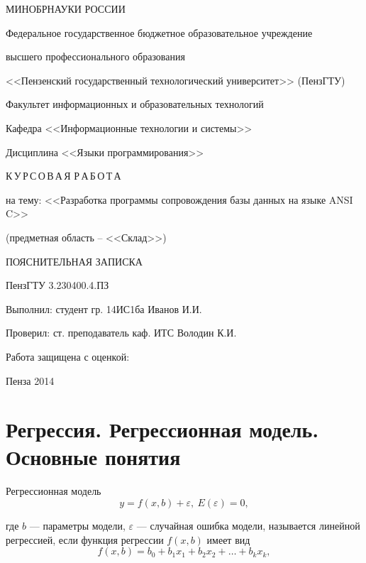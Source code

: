 \documentclass[oneside,a4paper,final,14pt]{article}
\begin{document}
	
\thispagestyle{empty}
\begin{center}
МИНОБРНАУКИ РОССИИ

Федеральное государственное бюджетное образовательное учреждение 

высшего профессионального образования

<<Пензенский государственный технологический университет>>
(ПензГТУ)

\vspace{36pt}

Факультет информационных и образовательных технологий

Кафедра <<Информационные технологии и системы>>

Дисциплина <<Языки программирования>>

\vspace{36pt}

К\,У\,Р\,С\,О\,В\,А\,Я Р\,А\,Б\,О\,Т\,А

на тему: <<Разработка программы сопровождения базы данных на языке ANSI C>>

(предметная область – <<Склад>>)

\vspace{72pt}

ПОЯСНИТЕЛЬНАЯ ЗАПИСКА

ПензГТУ 3.230400.4.ПЗ

\vspace{72pt}

\parbox{12cm}{
Выполнил: студент гр. 14ИС1ба Иванов И.И.

Проверил: ст. преподаватель каф. ИТС Володин К.И.

Работа защищена с оценкой:~\hrulefill
}

\vfill

Пенза 2014
\end{center}


\newpage
\section{Регрессия. Регрессионная модель. Основные понятия}

Регрессионная модель
\[
y=f(x,b)+\varepsilon, ~E(\varepsilon)=0,
\]

где $b$ — параметры модели, $\varepsilon$ — случайная ошибка модели, называется линейной регрессией, если функция регрессии $f(x,b)$ имеет вид
\begin{equation}
f(x,b)=b_0+b_1 x_1+b_2 x_2+\ldots+b_k x_k,
\end{equation}
\end{document}
